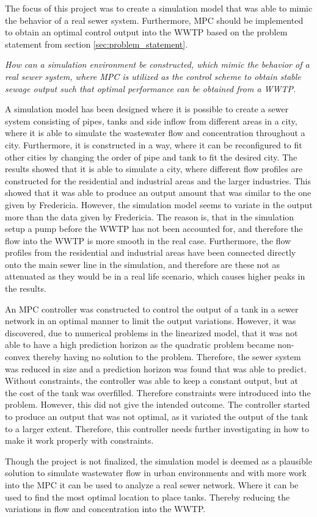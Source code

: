 The focus of this project was to create a simulation model that was able to mimic the behavior of a real sewer system. Furthermore, MPC should be implemented to obtain an optimal control output into the WWTP based on the problem statement from section \ref{sec:problem_statement}. 

\begin{center}
\textit{How can a simulation environment be constructed, which mimic the behavior of a real sewer system, where MPC is utilized as the control scheme to obtain stable sewage output such that optimal performance can be obtained from a WWTP.}
\end{center}

A simulation model has been designed where it is possible to create a sewer system consisting of pipes, tanks and side inflow from different areas in a city, where it is able to simulate the wastewater flow and concentration throughout a city. Furthermore, it is constructed in a way, where it can be reconfigured to fit other cities by changing the order of pipe and tank to fit the desired city. The results showed that it is able to simulate a city, where different flow profiles are constructed for the residential and industrial areas and the larger industries. This showed that it was able to produce an output amount that was similar to the one given by Fredericia. However, the simulation model seems to variate in the output more than the data given by Fredericia. The reason is, that in the simulation setup a pump before the WWTP has not been accounted for, and therefore the flow into the WWTP is more smooth in the real case. Furthermore, the flow profiles from the residential and industrial areas have been connected directly onto the main sewer line in the simulation, and therefore are these not as attenuated as they would be in a real life scenario, which causes higher peaks in the results.      

An MPC controller was constructed to control the output of a tank in a sewer network in an optimal manner to limit the output variations. However, it was discovered, due to numerical problems in the linearized model, that it was not able to have a high prediction horizon as the quadratic problem became non-convex thereby having no solution to the problem. Therefore, the sewer system was reduced in size and a prediction horizon was found that was able to predict. Without constraints, the controller was able to keep a constant output, but at the cost of the tank was overfilled. Therefore constraints were introduced into the problem. However, this did not give the intended outcome. The controller started to produce an output that was not optimal, as it variated the output of the tank to a larger extent. Therefore, this controller needs further investigating in how to make it work properly with constraints.        

Though the project is not finalized, the simulation model is deemed as a plausible solution to simulate wastewater flow in urban environments and with more work into the MPC it can be used to analyze a real sewer network. Where it can be used to find the most optimal location to place tanks. Thereby reducing the variations in flow and concentration into the WWTP.  



